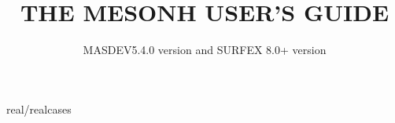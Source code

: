 \documentclass[11pt,a4paper]{book}
\begin{document}
\baselineskip=18pt
\newcommand{\dfrac}[2]{\frac{\displaystyle#1}{\displaystyle#2}}
\parindent=25pt




\begin{titlepage}
\title{ {\bf THE MESONH USER'S GUIDE}}
\author{MASDEV5.4.0 version and SURFEX 8.0+ version }
\end{titlepage}
\maketitle
\thispagestyle{empty}
\tableofcontents








 {real/realcases}







\appendix





\printindex
{}
{}
\end{document}
